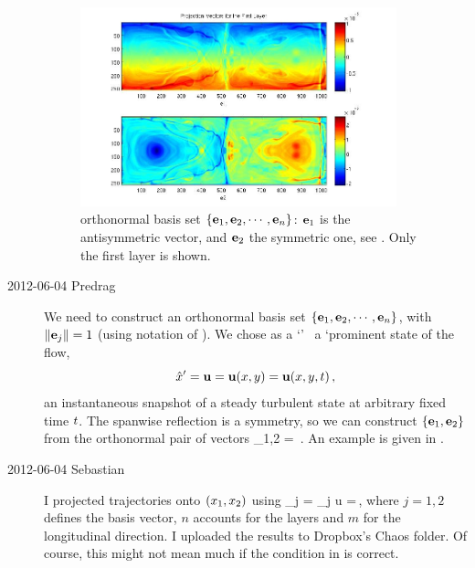 \begin{description}
\begin{figure}
\begin{center}
  \includegraphics[width=0.9\textwidth]{Projectionvectors}
\end{center}
  \caption{orthonormal basis set
$\{{\bf e}_1, {\bf e}_2, \cdots, {\bf e}_n\}$: ${\bf e}_1$ is
  the antisymmetric vector, and ${\bf e}_2$ the symmetric one, see
  . Only the first layer is shown.
  }\label{Projectionvectors}
\end{figure}

\item[2012-06-04 Predrag]
We need to construct an orthonormal basis set
$\{{\bf e}_1, {\bf e}_2, \cdots, {\bf e}_n\}$, with $\|{{\bf e}_j}\|=1$
(using notation of ).
We chose as a `\template' \slicep\ a `prominent state of the flow,
\[
{\hat{x}'} = {\bf u} = {\bf u}(x,y) = {\bf u}(x,y,t) \,,
\]
an instantaneous snapshot of a steady turbulent state at arbitrary fixed
time $t$.
The spanwise reflection is a symmetry, so we can construct $\{{\bf e}_1,
{\bf e}_2\}$ from the orthonormal pair of vectors
\beq
\be_{1,2} = 
\,.
An example is given in .

\item[2012-06-04 Sebastian]
I projected
trajectories onto $(x_1, x_2)$ using
\beq
\ssp_j = \be_{j} \cdot u =\Re \left[\sum_{n=1}^2\sum_{l=0}^{M-1}\sum_{k=0}^{N/2} u_{l,k,n} e^i_{l,k,n} \right]
\,,
where $j=1,2$ defines the basis vector, $n$ accounts for the layers and
$m$ for the longitudinal direction. I uploaded the results to Dropbox's
Chaos folder. Of course, this might not mean much if the {\chartBord}
condition in  is correct.


\end{description}
